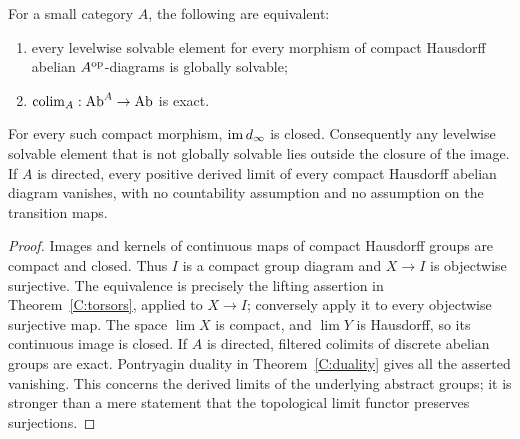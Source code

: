 \begin{theorem}\label{E:compact}
For a small category $A$, the following are equivalent:
\begin{enumerate}[label=(\roman*)]
\item every levelwise solvable element for every morphism of compact Hausdorff abelian $A^{\mathrm{op}}$-diagrams is globally solvable;
\item $\operatorname*{colim}_A:\mathrm{Ab}^A\to\mathrm{Ab}$ is exact.
\end{enumerate}
For every such compact morphism, $\operatorname{im} d_\infty$ is closed. Consequently any levelwise solvable element that is not globally solvable lies outside the closure of the image. If $A$ is directed, every positive derived limit of every compact Hausdorff abelian diagram vanishes, with no countability assumption and no assumption on the transition maps.
\end{theorem}
\begin{proof}
Images and kernels of continuous maps of compact Hausdorff groups are compact and closed. Thus $I$ is a compact group diagram and $X\to I$ is objectwise surjective. The equivalence is precisely the lifting assertion in Theorem~\ref{C:torsors}, applied to $X\to I$; conversely apply it to every objectwise surjective map. The space $\lim X$ is compact, and $\lim Y$ is Hausdorff, so its continuous image is closed. If $A$ is directed, filtered colimits of discrete abelian groups are exact. Pontryagin duality in Theorem~\ref{C:duality} gives all the asserted vanishing. This concerns the derived limits of the underlying abstract groups; it is stronger than a mere statement that the topological limit functor preserves surjections.
\end{proof}

